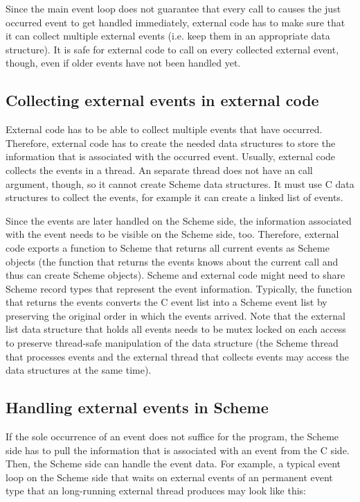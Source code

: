 Since the main event loop does not guarantee that every call to
 causes the just occurred event to
get handled immediately, external code has to make sure that it can
collect multiple external events (i.e. keep them in an appropriate
data structure).  It is safe for external code to call
 on every collected external event,
though, even if older events have not been handled yet.

\subsection{Collecting external events in external code}

External code has to be able to collect multiple events that have
occurred.  Therefore, external code has to create the needed data
structures to store the information that is associated with the
occurred event.  Usually, external code collects the events in a
thread.  An separate thread does not have an call argument, though, so
it cannot create Scheme data structures.  It must use C data
structures to collect the events, for example it can create a linked
list of events.

Since the events are later handled on the Scheme side, the information
associated with the event needs to be visible on the Scheme side, too.
Therefore, external code exports a function to Scheme that returns all
current events as Scheme objects (the function that returns the events
knows about the current call and thus can create Scheme objects).
Scheme and external code might need to share Scheme record types that
represent the event information.  Typically, the function that returns
the events converts the C event list into a Scheme event list by
preserving the original order in which the events arrived.  Note that
the external list data structure that holds all events needs to be
mutex locked on each access to preserve thread-safe manipulation of
the data structure (the Scheme thread that processes events and the
external thread that collects events may access the data structures at
the same time).

\subsection{Handling external events in Scheme}

If the sole occurrence of an event does not suffice for the program,
the Scheme side has to pull the information that is associated with an
event from the C side.  Then, the Scheme side can handle the event
data.  For example, a typical event loop on the Scheme side that waits
on external events of an permanent event type that an long-running
external thread produces may look like this:

